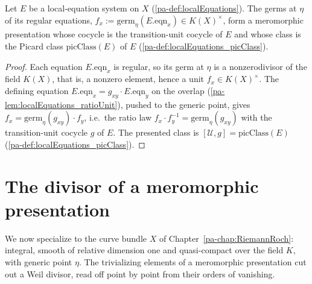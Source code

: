 \begin{lemma}
  \label{pa-lem:localEquations_presentation}
  \leanok

  Let \(E\) be a local-equation system on \(X\) (\ref{pa-def:localEquations}). The germs at \(\eta\)
  of its regular equations, \(f_x := \mathrm{germ}_\eta(E.\mathrm{eqn}_x) \in K(X)^{\times}\), form
  a meromorphic presentation whose cocycle is the transition-unit cocycle of \(E\) and whose class
  is the Picard class \(\mathrm{picClass}(E)\) of \(E\) (\ref{pa-def:localEquations_picClass}).
\end{lemma}
\begin{proof}
  \leanok
  Each equation \(E.\mathrm{eqn}_x\) is regular, so its germ at \(\eta\) is a nonzerodivisor of the
  field \(K(X)\), that is, a nonzero element, hence a unit \(f_x \in K(X)^{\times}\). The defining
  equation \(E.\mathrm{eqn}_x = g_{xy} \cdot E.\mathrm{eqn}_y\) on the overlap
  (\ref{pa-lem:localEquations_ratioUnit}), pushed to the generic point, gives \(f_x = \mathrm{germ}_\eta(g_{xy}) \cdot f_y\),
  i.e.\ the ratio law \(f_x \cdot f_y^{-1} = \mathrm{germ}_\eta(g_{xy})\) with the transition-unit
  cocycle \(g\) of \(E\). The presented class is \([\mathcal U, g] = \mathrm{picClass}(E)\)
  (\ref{pa-def:localEquations_picClass}).
\end{proof}

\section{The divisor of a meromorphic presentation}

We now specialize to the curve bundle \(X\) of Chapter~\ref{pa-chap:RiemannRoch}: integral, smooth of
relative dimension one and quasi-compact over the field \(K\), with generic point \(\eta\). The
trivializing elements of a meromorphic presentation cut out a Weil divisor, read off point by
point from their orders of vanishing.

